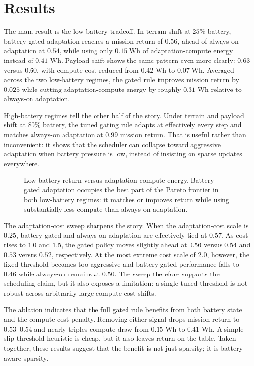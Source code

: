 \section{Results}



The main result is the low-battery tradeoff. In terrain shift at $25\%$ battery, battery-gated adaptation reaches a mission return of $0.56$, ahead of always-on adaptation at $0.54$, while using only $0.15$ Wh of adaptation-compute energy instead of $0.41$ Wh. Payload shift shows the same pattern even more clearly: $0.63$ versus $0.60$, with compute cost reduced from $0.42$ Wh to $0.07$ Wh. Averaged across the two low-battery regimes, the gated rule improves mission return by $0.025$ while cutting adaptation-compute energy by roughly $0.31$ Wh relative to always-on adaptation.

High-battery regimes tell the other half of the story. Under terrain and payload shift at $80\%$ battery, the tuned gating rule adapts at effectively every step and matches always-on adaptation at $0.99$ mission return. That is useful rather than inconvenient: it shows that the scheduler can collapse toward aggressive adaptation when battery pressure is low, instead of insisting on sparse updates everywhere.

\begin{figure}[t]
\centering

\caption{Low-battery return versus adaptation-compute energy. Battery-gated adaptation occupies the best part of the Pareto frontier in both low-battery regimes: it matches or improves return while using substantially less compute than always-on adaptation.}
\label{fig:tradeoff}
\end{figure}



The adaptation-cost sweep sharpens the story. When the adaptation-cost scale is $0.25$, battery-gated and always-on adaptation are effectively tied at $0.57$. As cost rises to $1.0$ and $1.5$, the gated policy moves slightly ahead at $0.56$ versus $0.54$ and $0.53$ versus $0.52$, respectively. At the most extreme cost scale of $2.0$, however, the fixed threshold becomes too aggressive and battery-gated performance falls to $0.46$ while always-on remains at $0.50$. The sweep therefore supports the scheduling claim, but it also exposes a limitation: a single tuned threshold is not robust across arbitrarily large compute-cost shifts.



The ablation indicates that the full gated rule benefits from both battery state and the compute-cost penalty. Removing either signal drops mission return to $0.53$--$0.54$ and nearly triples compute draw from $0.15$ Wh to $0.41$ Wh. A simple slip-threshold heuristic is cheap, but it also leaves return on the table. Taken together, these results suggest that the benefit is not just sparsity; it is battery-aware sparsity.

